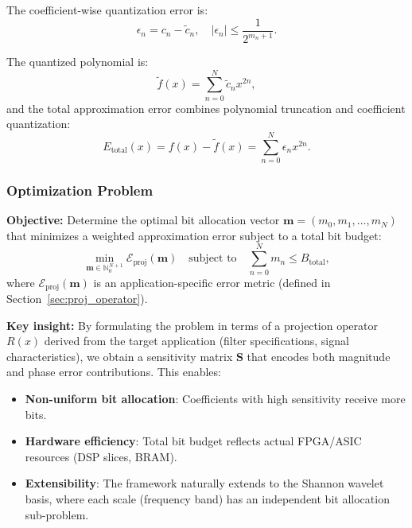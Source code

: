 The coefficient-wise quantization error is:
\begin{equation}
\epsilon_n = c_n - \tilde{c}_n, \quad |\epsilon_n| \leq \frac{1}{2^{m_n+1}}.
\label{eq:coeff_error}
\end{equation}

The quantized polynomial is:
\begin{equation}
\tilde{f}(x) = \sum_{n=0}^{N} \tilde{c}_n x^{2n},
\end{equation}
and the total approximation error combines polynomial truncation and coefficient quantization:
\begin{equation}
E_{\text{total}}(x) = f(x) - \tilde{f}(x) = \sum_{n=0}^{N} \epsilon_n x^{2n}.
\label{eq:total_error}
\end{equation}

\subsubsection{Optimization Problem}

\textbf{Objective:} Determine the optimal bit allocation vector $\mathbf{m} = (m_0, m_1, \ldots, m_N)$ that minimizes a weighted approximation error subject to a total bit budget:
\begin{equation}
\min_{\mathbf{m} \in \mathbb{N}_0^{N+1}} \mathcal{E}_{\text{proj}}(\mathbf{m}) \quad \text{subject to} \quad \sum_{n=0}^{N} m_n \leq B_{\text{total}},
\label{eq:opt_problem}
\end{equation}
where $\mathcal{E}_{\text{proj}}(\mathbf{m})$ is an application-specific error metric (defined in Section~\ref{sec:proj_operator}).

\textbf{Key insight:} By formulating the problem in terms of a projection operator $R(x)$ derived from the target application (filter specifications, signal characteristics), we obtain a sensitivity matrix $\mathbf{S}$ that encodes both magnitude and phase error contributions. This enables:
\begin{itemize}
\item \textbf{Non-uniform bit allocation}: Coefficients with high sensitivity receive more bits.
\item \textbf{Hardware efficiency}: Total bit budget reflects actual FPGA/ASIC resources (DSP slices, BRAM).
\item \textbf{Extensibility}: The framework naturally extends to the Shannon wavelet basis, where each scale (frequency band) has an independent bit allocation sub-problem.
\end{itemize}

